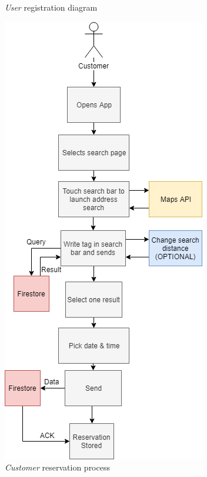 \begin{figure}[H]
\begin{minipage}[b]{0.45\textwidth}
	\caption{\emph{User} registration diagram}
	  \label{fig:RegistrationDiagram}
  \end{minipage}
  \hfill
  \begin{minipage}[b]{0.45\textwidth}
    \includegraphics[width=\textwidth]{Img/ReservationDiagram}
	\caption{\emph{Customer} reservation process}
	  \label{fig:ReservationDiagram}
  \end{minipage}
\end{figure}














